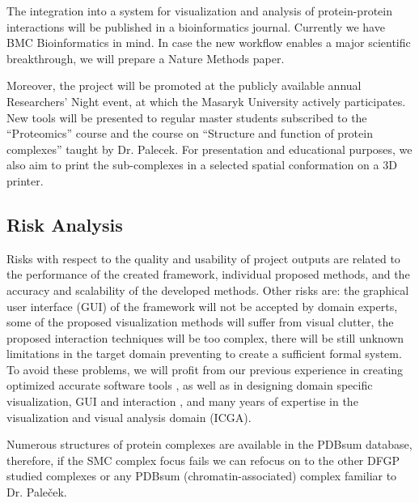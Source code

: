 \documentclass[11pt,a4paper,titlepage,oneside,onecolumn]{article}
\begin{document}
The integration into a system for visualization and analysis of protein-protein interactions will be published in a bioinformatics journal. Currently we have BMC Bioinformatics in mind. In case the new workflow enables a major scientific breakthrough, we will prepare a Nature Methods paper. 


Moreover, the project will be promoted at the publicly available annual Researchers' Night event, at which the Masaryk University actively participates. New tools will be presented to regular master students subscribed to the “Proteomics” course and the course on “Structure and function of protein complexes” taught by Dr. Palecek. For presentation and educational purposes, we also aim to print the sub-complexes in a selected spatial conformation on a 3D printer. 

\subsection{Risk Analysis}
Risks with respect to the quality and usability of project outputs are related to the performance of the created framework,  individual proposed methods, and the accuracy and scalability of the developed methods. Other risks are: the graphical user interface (GUI) of the framework will not be accepted by domain experts, some of the proposed visualization methods will suffer from visual clutter, the proposed interaction techniques will be too complex, there will be still unknown limitations in the target domain preventing to create a sufficient formal system.
To avoid these problems, we will profit from our previous experience in creating optimized accurate software tools \cite{caver}, as well as in designing domain specific visualization, GUI and interaction \cite{analyst}, and many years of expertise in the visualization and visual analysis domain (ICGA). 

Numerous structures of protein complexes are available in the PDBsum database, therefore, if the SMC complex focus fails we can refocus on to the other DFGP studied complexes or any PDBsum (chromatin-associated) complex familiar to Dr. Pale\v{c}ek. 
\end{document}
